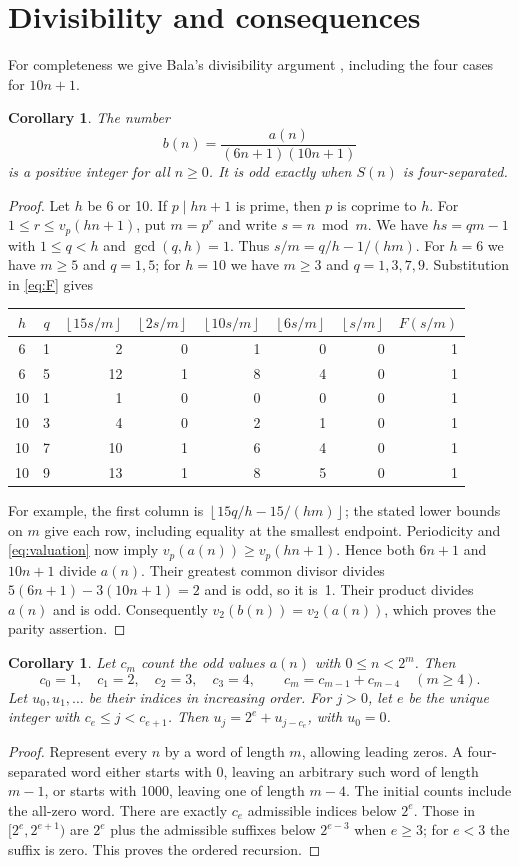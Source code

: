 \documentclass[11pt]{article}
\newtheorem{corollary}[theorem]{Corollary}
\newcommand{\fl}[1]{\left\lfloor #1\right\rfloor}
\begin{document}
\section{Divisibility and consequences}
For completeness we give Bala's divisibility argument \cite{bala}, including
the four cases for $10n+1$.
\begin{corollary}\label{cor:quotient}
The number
\[
 b(n)=\frac{a(n)}{(6n+1)(10n+1)}
\]
is a positive integer for all $n\geq0$. It is odd exactly when $S(n)$
is four-separated.
\end{corollary}
\begin{proof}
Let $h$ be 6 or 10. If $p\mid hn+1$ is prime, then $p$ is coprime
to $h$. For $1\leq r\leq v_p(hn+1)$, put $m=p^r$ and write
$s=n\bmod m$. We have $hs=qm-1$ with $1\leq q<h$ and
$\gcd(q,h)=1$. Thus $s/m=q/h-1/(hm)$.
For $h=6$ we have $m\geq5$ and $q=1,5$; for $h=10$ we have
$m\geq3$ and $q=1,3,7,9$. Substitution in \eqref{eq:F} gives
\begin{center}
\begin{tabular}{cc|rrrrr|r}
\toprule
$h$&$q$&$\fl{15s/m}$&$\fl{2s/m}$&$\fl{10s/m}$&$\fl{6s/m}$&$\fl{s/m}$&$F(s/m)$\\
\midrule
6&1&2&0&1&0&0&1\\
6&5&12&1&8&4&0&1\\
10&1&1&0&0&0&0&1\\
10&3&4&0&2&1&0&1\\
10&7&10&1&6&4&0&1\\
10&9&13&1&8&5&0&1\\
\bottomrule
\end{tabular}
\end{center}
For example, the first column is $\fl{15q/h-15/(hm)}$;
the stated lower bounds on $m$ give each row, including equality at
the smallest endpoint. Periodicity and \eqref{eq:valuation} now imply
$v_p(a(n))\geq v_p(hn+1)$. Hence both $6n+1$ and $10n+1$ divide
$a(n)$. Their greatest common divisor divides
$5(6n+1)-3(10n+1)=2$ and is odd, so it is~1.
Their product divides $a(n)$ and is odd. Consequently $v_2(b(n))=v_2(a(n))$,
which proves the parity assertion.
\end{proof}

\begin{corollary}\label{cor:count}
Let $c_m$ count the odd values $a(n)$ with $0\leq n<2^m$. Then
\[
 c_0=1,\quad c_1=2,\quad c_2=3,\quad c_3=4,\qquad
 c_m=c_{m-1}+c_{m-4}\quad(m\geq4).
\]
Let $u_0,u_1,\ldots$ be their indices in increasing order. For $j>0$, let
$e$ be the unique integer with $c_e\leq j<c_{e+1}$. Then
$u_j=2^e+u_{j-c_e}$, with $u_0=0$.
\end{corollary}
\begin{proof}
Represent every $n$ by a word of length $m$,
allowing leading zeros. A four-separated word either starts with 0,
leaving an arbitrary such word of length $m-1$, or starts with 1000,
leaving one of length $m-4$. The initial counts include the all-zero word.
There are exactly $c_e$ admissible indices below $2^e$. Those in
$[2^e,2^{e+1})$ are $2^e$ plus the admissible suffixes below $2^{e-3}$
when $e\geq3$; for $e<3$ the suffix is zero. This proves the ordered recursion.
\end{proof}
\end{document}
